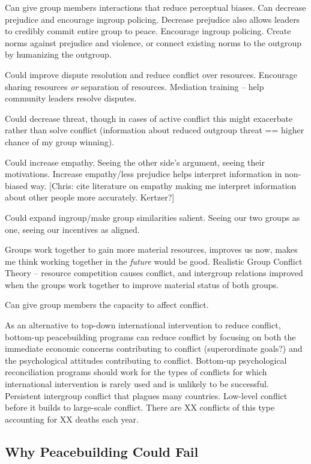 \documentclass[11pt]{article}
\begin{document}
Can give group members interactions that reduce perceptual biases. Can
decrease prejudice and encourage ingroup policing. Decrease prejudice
also allows leaders to credibly commit entire group to peace. Encourage
ingroup policing. Create norms against prejudice and violence, or
connect existing norms to the outgroup by humanizing the outgroup.

Could improve dispute resolution and reduce conflict over resources.
Encourage sharing resources \emph{or} separation of resources. Mediation
training -- help community leaders resolve disputes.

Could decrease threat, though in cases of active conflict this might
exacerbate rather than solve conflict (information about reduced
outgroup threat == higher chance of my group winning).

Could increase empathy. Seeing the other side's argument, seeing their
motivations. Increase empathy/less prejudice helps interpret information
in non-biased way. {[}Chris: cite literature on empathy making me
interpret information about other people more accurately. Kertzer?{]}

Could expand ingroup/make group similarities salient. Seeing our two
groups as one, seeing our incentives as aligned.

Groups work together to gain more material resources, improves us now,
makes me think working together in the \emph{future} would be good.
Realistic Group Conflict Theory -- resource competition causes conflict,
and intergroup relations improved when the groups work together to
improve material status of both groups.

Can give group members the capacity to affect conflict.

As an alternative to top-down international intervention to reduce
conflict, bottom-up peacebuilding programs can reduce conflict by
focusing on both the immediate economic concerns contributing to
conflict (superordinate goals?) and the psychological attitudes
contributing to conflict. Bottom-up psychological reconciliation
programs should work for the types of conflicts for which international
intervention is rarely used and is unlikely to be successful. Persistent
intergroup conflict that plagues many countries. Low-level conflict
before it builds to large-scale conflict. There are XX conflicts of this
type accounting for XX deaths each year.

\subsection{Why Peacebuilding Could
Fail}\label{why-peacebuilding-could-fail}
\end{document}
